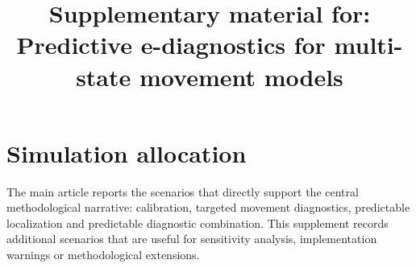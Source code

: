 \documentclass[pdflatex,sn-basic]{sn-jnl}
\newcommand{\1}{\mathbf 1}
\begin{document}
\title[Supplementary material for predictive HMM e-diagnostics]{Supplementary material for: Predictive e-diagnostics for multi-state movement models}

\author[1]{ }

\maketitle

\section{Simulation allocation}

The main article reports the scenarios that directly support the central methodological narrative: calibration, targeted movement diagnostics, predictable localization and predictable diagnostic combination. This supplement records additional scenarios that are useful for sensitivity analysis, implementation warnings or methodological extensions.
\end{document}
